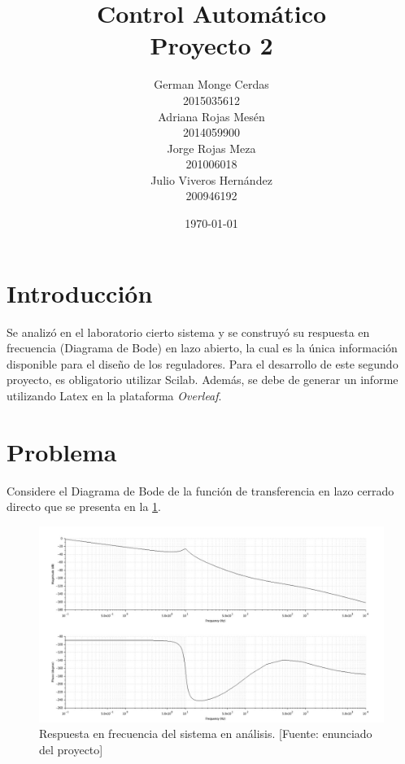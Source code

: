 \documentclass[12pt,letterpaper]{article}
\begin{document}
\title{Control Automático\\Proyecto 2}

\author{German Monge Cerdas\\2015035612\\Adriana Rojas Mesén\\2014059900\\Jorge Rojas Meza\\201006018\\Julio Viveros Hernández\\200946192}
\date{\today}
\maketitle
\section{Introducción}
Se analizó en el laboratorio cierto sistema y se construyó su respuesta en frecuencia (Diagrama de Bode) en lazo abierto, la cual es la única información disponible para el diseño de los reguladores. Para el desarrollo de este segundo proyecto, es obligatorio utilizar Scilab. Además, se debe de generar un informe utilizando Latex en la plataforma \textit{Overleaf}.

\section{Problema}

Considere el Diagrama de Bode de la función de transferencia en lazo cerrado directo que se presenta en la \ref{fig:fig1}.\\

\begin{figure}[hbtp]
	\centering
	\includegraphics[width = \columnwidth]{Figura1.jpg} 
	\caption[Figura3]{Respuesta en frecuencia del sistema en análisis. [Fuente: enunciado del proyecto]} 
	\label{fig:fig1} 
\end{figure}
\end{document}
